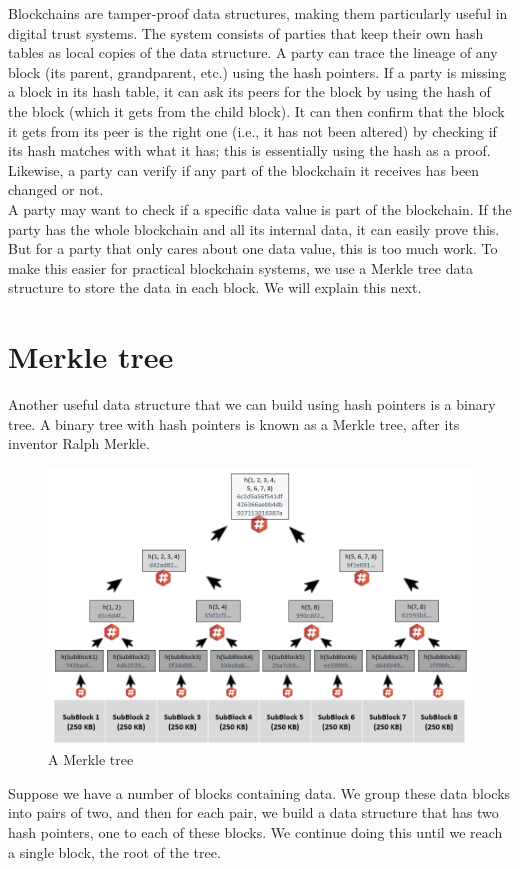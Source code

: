 Blockchains are tamper-proof data structures, making them particularly useful in digital trust systems. The system consists of parties that keep their own hash tables as local copies of the data structure. A party can trace the lineage of any block (its parent, grandparent, etc.) using the hash pointers. If a party is missing a block in its hash table, it can ask its peers for the block by using the hash of the block (which it gets from the child block). It can then confirm that the block it gets from its peer is the right one (i.e., it has not been altered) by checking if its hash matches with what it has; this is essentially using the hash as a proof. Likewise, a party can verify if any part of the blockchain it receives has been changed or not.\\
A party may want to check if a specific data value is part of the blockchain. If the party has the whole blockchain and all its internal data, it can easily prove this. But for a party that only cares about one data value, this is too much work. To make this easier for practical blockchain systems, we use a Merkle tree data structure to store the data in each block. We will explain this next.
\section{Merkle tree}
Another useful data structure that we can build using hash pointers is a binary tree. A binary tree with hash pointers is known as a Merkle tree, after its inventor Ralph Merkle.
\begin{figure}[h!]
	\centering
	\includegraphics[width=0.65\linewidth]{Fig/02/F2}
	\caption{A Merkle tree}
	\label{fig:f2}
\end{figure}
Suppose we have a number of blocks containing data. We group these data blocks into pairs of two, and then for each pair, we build a data structure that has two hash pointers, one to each of these blocks. We continue doing this until we reach a single block, the root of the tree.

